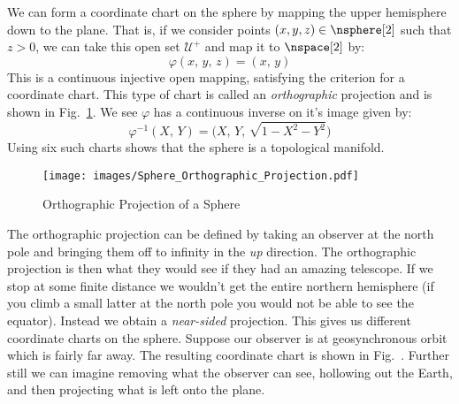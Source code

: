         \begin{example}
            We can form a coordinate chart on the sphere by mapping the
            upper hemisphere down to the plane. That is, if we consider
            points $(x,y,z)\in\nsphere[2]$ such that $z>0$, we can take
            this open set $\mathcal{U}^{+}$ and map it to $\nspace[2]$
            by:
            \begin{equation}
                \varphi(x,\,y,\,z)=(x,\,y)
            \end{equation}
            This is a continuous injective open mapping, satisfying the
            criterion for a coordinate chart. This type of chart is
            called an \textit{orthographic} projection and is shown in
            Fig.~\ref{fig:Sphere_Orthographic_Projection}. We see
            $\varphi$ has a continuous inverse on it's image given by:
            \begin{equation}
                \varphi^{\minus{1}}(X,\,Y)=
                    \big(X,\,Y,\,\sqrt{1-X^{2}-Y^{2}}\big)
            \end{equation}
            Using six such charts shows that the sphere is a topological
            manifold.
        \end{example}
        \begin{figure}[H]
            \centering
            \captionsetup{type=figure}
            \texttt{[image: images/Sphere\_Orthographic\_Projection.pdf]}
            \caption{Orthographic Projection of a Sphere}
            \label{fig:Sphere_Orthographic_Projection}
        \end{figure}
        The orthographic projection can be defined by taking an observer
        at the north pole and bringing them off to infinity in the
        \textit{up} direction. The orthographic projection is then what
        they would see if they had an amazing telescope. If we stop at
        some finite distance we wouldn't get the entire northern
        hemisphere (if you climb a small latter at the north pole you
        would not be able to see the equator). Instead we obtain a
        \textit{near-sided} projection. This gives us different
        coordinate charts on the sphere.
        Suppose our observer is at geosynchronous orbit which is fairly
        far away. The resulting coordinate chart is shown in
        Fig.~. Further still we can imagine
        removing what the observer can see, hollowing out the Earth, and
        then projecting what is left onto the plane.
